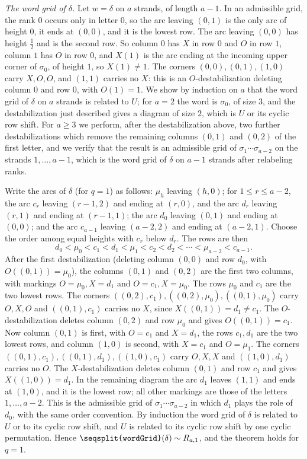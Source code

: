 \documentclass[11pt]{amsart}
\theoremstyle{definition}
\theoremstyle{remark}
\newcommand{\lean}[1]{\texttt{\seqsplit{#1}}}
\newcommand{\Mov}{\mathrel{\sim}}
\begin{document}
\emph{The word grid of $\delta$.} Let $w=\delta$ on $a$ strands, of length $a-1$. In an admissible grid,
the rank $0$ occurs only in letter $0$, so the arc leaving $(0,1)$ is the only arc of height $0$, it
ends at $(0,0)$, and it is the lowest row. The arc leaving $(0,0)$ has height $\frac12$ and is the
second row. So column $0$ has $X$ in row $0$ and $O$ in row $1$, column $1$ has $O$ in row $0$, and
$X(1)$ is the arc ending at the incoming upper corner of $\sigma_0$, of height $1$, so $X(1)\ne 1$. The
corners $(0,0),(0,1),(1,0)$ carry $X,O,O$, and $(1,1)$ carries no $X$: this is an $O$-destabilization
deleting column $0$ and row $0$, with $O(1)=1$. We show by induction on $a$ that the word grid of
$\delta$ on $a$ strands is related to $U$; for $a=2$ the word is $\sigma_0$, of size $3$, and the
destabilization just described gives a diagram of size $2$, which is $U$ or its cyclic row shift.
For $a\ge3$ we perform, after the destabilization above, two further destabilizations which remove
the remaining columns $(0,1)$ and $(0,2)$ of the first letter, and we verify that the result is an
admissible grid of $\sigma_1\cdots\sigma_{a-2}$ on the strands $1,\dots,a-1$, which is the word grid
of $\delta$ on $a-1$ strands after relabeling ranks.

Write the arcs of $\delta$ (for $q=1$) as follows: $\mu_h$ leaving $(h,0)$; for $1\le r\le a-2$, the arc
$c_r$ leaving $(r-1,2)$ and ending at $(r,0)$, and the arc $d_r$ leaving $(r,1)$ and ending at
$(r-1,1)$; the arc $d_0$ leaving $(0,1)$ and ending at $(0,0)$; and the arc $c_{a-1}$ leaving
$(a-2,2)$ and ending at $(a-2,1)$. Choose the order among equal heights with $c_r$ below $d_r$. The rows
are then
\[
d_0<\mu_0<c_1<d_1<\mu_1<c_2<d_2<\cdots<\mu_{a-2}<c_{a-1}.
\]
After the first destabilization (deleting column $(0,0)$ and row $d_0$, with $O((0,1))=\mu_0$), the
columns $(0,1)$ and $(0,2)$ are the first two columns, with markings $O=\mu_0,X=d_1$ and
$O=c_1,X=\mu_0$. The rows $\mu_0$ and $c_1$ are the two lowest rows. The corners
$((0,2),c_1),((0,2),\mu_0),((0,1),\mu_0)$ carry $O,X,O$ and $((0,1),c_1)$ carries no $X$, since
$X((0,1))=d_1\neq c_1$. The $O$-destabilization deletes column $(0,2)$ and row $\mu_0$ and gives
$O((0,1))=c_1$. Now column $(0,1)$ is first, with $O=c_1$ and $X=d_1$, the rows $c_1,d_1$ are the two
lowest rows, and column $(1,0)$ is second, with $X=c_1$ and $O=\mu_1$. The corners
$((0,1),c_1),((0,1),d_1),((1,0),c_1)$ carry $O,X,X$ and $((1,0),d_1)$ carries no $O$. The
$X$-destabilization deletes column $(0,1)$ and row $c_1$ and gives $X((1,0))=d_1$. In the remaining
diagram the arc $d_1$ leaves $(1,1)$ and ends at $(1,0)$, and it is the lowest row; all other markings
are those of the letters $1,\dots,a-2$. This is the admissible grid of $\sigma_1\cdots\sigma_{a-2}$ in
which $d_1$ plays the role of $d_0$, with the same order convention. By induction the word grid of
$\delta$ is related to $U$ or to its cyclic row shift, and $U$ is related to its cyclic row shift by
one cyclic permutation. Hence $\lean{wordGrid}(\delta)\Mov R_{a,1}$, and the theorem holds for $q=1$.
\end{document}
